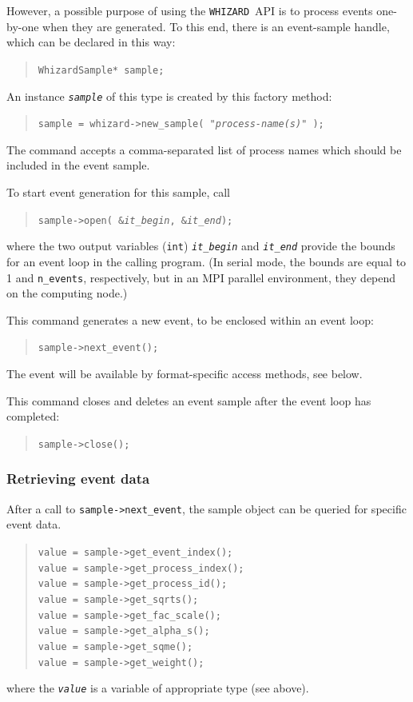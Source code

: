 \documentclass[12pt]{book}
\newcommand{\ttt}[1]{\texttt{#1}}
\newcommand{\whizard}{\ttt{WHIZARD}}
\begin{document}
However, a possible purpose of using the \whizard\ API is to process events one-by-one
when they are generated.  To this end, there is an event-sample handle, which
can be declared in this way:
\begin{quote}
  \tt WhizardSample* {sample};
\end{quote}
An instance \ttt{\it sample} of this type is created by this factory method:
\begin{quote}
  \tt {sample} = whizard->new\_sample( "\textit{process-name(s)}" );
\end{quote}
The command accepts a comma-separated list of process names which should be
included in the event sample.

To start event generation for this sample, call
\begin{quote}
  \tt sample->open( \&\textit{it\_begin},
  \&\textit{it\_end});
\end{quote}
where the two output variables (\ttt{int}) \ttt{\it it\_begin} and
\ttt{\it it\_end}
provide the bounds for an event loop in the calling program.  (In serial mode,
the bounds are equal to 1 and \ttt{n\_events}, respectively, but in an MPI
parallel environment, they depend on the computing node.)

This command generates a new event, to be enclosed within an event loop:
\begin{quote}
  \tt sample->next\_event();
\end{quote}
The event will be available by format-specific access methods, see below.

This command closes and deletes an event sample after the event loop has
completed:
\begin{quote}
  \tt sample->close();
\end{quote}

\subsubsection{Retrieving event data}

After a call to \ttt{sample->next\_event}, the sample object can be
queried for specific event data.
\begin{quote}
  \tt value = sample->get\_event\_index();
  \\
  \tt value = sample->get\_process\_index();
  \\
  \tt value = sample->get\_process\_id();
  \\
  \tt value = sample->get\_sqrts();
  \\
  \tt value = sample->get\_fac\_scale();
  \\
  \tt value = sample->get\_alpha\_s();
  \\
  \tt value = sample->get\_sqme();
  \\
  \tt value = sample->get\_weight();
\end{quote}
where the \ttt{\it value} is a variable of appropriate type (see above).
\end{document}
